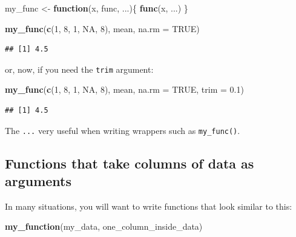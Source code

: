 \documentclass[]{gitbook}
\newenvironment{Shaded}{\begin{snugshade}}{\end{snugshade}}
\newcommand{\ControlFlowTok}[1]{\textcolor[rgb]{0.13,0.29,0.53}{\textbf{#1}}}
\newcommand{\DataTypeTok}[1]{\textcolor[rgb]{0.13,0.29,0.53}{#1}}
\newcommand{\DecValTok}[1]{\textcolor[rgb]{0.00,0.00,0.81}{#1}}
\newcommand{\FloatTok}[1]{\textcolor[rgb]{0.00,0.00,0.81}{#1}}
\newcommand{\KeywordTok}[1]{\textcolor[rgb]{0.13,0.29,0.53}{\textbf{#1}}}
\newcommand{\NormalTok}[1]{#1}
\newcommand{\OtherTok}[1]{\textcolor[rgb]{0.56,0.35,0.01}{#1}}
\newcommand{\StringTok}[1]{\textcolor[rgb]{0.31,0.60,0.02}{#1}}
\theoremstyle{definition}
\theoremstyle{definition}
\theoremstyle{definition}
\theoremstyle{remark}
\begin{document}
\begin{Shaded}
\begin{Highlighting}[]
\NormalTok{my_func <-}\StringTok{ }\ControlFlowTok{function}\NormalTok{(x, func, ...)\{}
  \KeywordTok{func}\NormalTok{(x, ...)}
\NormalTok{\}}

\KeywordTok{my_func}\NormalTok{(}\KeywordTok{c}\NormalTok{(}\DecValTok{1}\NormalTok{, }\DecValTok{8}\NormalTok{, }\DecValTok{1}\NormalTok{, }\OtherTok{NA}\NormalTok{, }\DecValTok{8}\NormalTok{), mean, }\DataTypeTok{na.rm =} \OtherTok{TRUE}\NormalTok{)}
\end{Highlighting}
\end{Shaded}

\begin{verbatim}
## [1] 4.5
\end{verbatim}

or, now, if you need the \texttt{trim} argument:

\begin{Shaded}
\begin{Highlighting}[]
\KeywordTok{my_func}\NormalTok{(}\KeywordTok{c}\NormalTok{(}\DecValTok{1}\NormalTok{, }\DecValTok{8}\NormalTok{, }\DecValTok{1}\NormalTok{, }\OtherTok{NA}\NormalTok{, }\DecValTok{8}\NormalTok{), mean, }\DataTypeTok{na.rm =} \OtherTok{TRUE}\NormalTok{, }\DataTypeTok{trim =} \FloatTok{0.1}\NormalTok{)}
\end{Highlighting}
\end{Shaded}

\begin{verbatim}
## [1] 4.5
\end{verbatim}

The \texttt{...} very useful when writing wrappers such as
\texttt{my\_func()}.

\hypertarget{functions-that-take-columns-of-data-as-arguments}{%
\subsection{Functions that take columns of data as
arguments}\label{functions-that-take-columns-of-data-as-arguments}}

In many situations, you will want to write functions that look similar
to this:

\begin{Shaded}
\begin{Highlighting}[]
\KeywordTok{my_function}\NormalTok{(my_data, one_column_inside_data)}
\end{Highlighting}
\end{Shaded}
\end{document}
